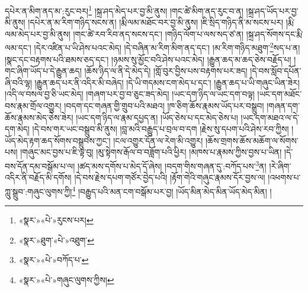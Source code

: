 དཔེར་ན་མིག་ནད་མ་:རུང་བར།\footnote{«སྣར་»«པེ་»རུངས་པར།} །སྐྲ་ཤད་མེད་པར་བྱ་མི་ནུས། །གང་ཚེ་མིག་ནད་རུང་བ་ན། །སྐྲ་ཤད་ཡོད་པར་བྱ་མི་ནུས། །དཔེར་ན་མ་རིག་གཉིད་སངས་ན། །རྨི་ལམ་མཐོང་བར་བྱ་མི་ནུས། །ཇི་སྲིད་གཉིད་ནི་མ་སངས་པར། །རྨི་ལམ་མེད་པར་བྱ་མི་ནུས། །གང་ཚེ་རབ་རིབ་ནད་སངས་དང་། །གཉིད་ལོག་པ་ལས་སད་ཙ་ན། །སྐྲ་ཤད་སོགས་དང་རྨི་ལམ་དང་། །དེར་འཛིན་པ་ཡི་ཤེས་པའང་མེད། །དེ་བཞིན་མ་རིག་མིག་ནད་དང་། །མ་རིག་གཉིད་མཐུག་\footnote{«སྣར་»ཐུག་«པེ་»འཐུག་}སད་པ་ན། །སྣང་དང་བརྟགས་པའི་ཐམས་ཅད་དང་། །ཉམས་སུ་མྱོང་བའི་ཤེས་པའང་མེད། །རྒྱུན་ཆད་མ་ཆད་ཅེས་བརྗོད་པ། །གང་ཞིག་ཡོད་པ་དེ་རྒྱུན་ཆད། །ཆོས་ཉིད་ལ་ནི་དེ་མེད་དེ། །གློ་བུར་བྱིས་པས་བརྟགས་པར་ཟད། །དེ་བས་སློབ་དཔོན་ཞི་བའི་ལྷ། །རྒྱུན་ཆད་པར་ནི་འདིར་མི་བཞེད། །དེ་ཡི་གདམས་ངག་མེད་པ་དང་། །རྒྱུན་ཆད་པ་ཡི་གཞུང་ཡིན་ཟེར། །འདི་ལ་བསལ་བྱ་ཅི་ཡང་མེད། །གཞག་པར་བྱ་བ་ཅུང་ཟད་མེད། །ཡང་དག་ཉིད་ལ་ཡང་དག་བལྟ། །ཡང་དག་མཐོང་བས་རྣམ་གྲོལ་འགྱུར། །བདག་དང་གཞན་གྱི་གྲུབ་པའི་མཐའ། །ཁ་ཅིག་ཆོས་རྣམས་ཡོད་པར་བསྒྲུབ། །གཞན་དག་ཆོས་རྣམས་མེད་ཅེས་ཟེར། །ཡང་དག་ཉིད་ལ་རྣམ་དཔྱད་ན། །ཡོད་ཅེས་པ་དང་མེད་ཅེས་པ། །ཡང་དག་མཐའ་ལ་དེ་དག་མེད། །དེ་བས་གར་ཡང་བསྒྲུབ་མི་ནུས། །བླ་མའི་བརྒྱུད་པ་བྲལ་བ་དག །རྗེས་སུ་དཔག་པའི་ཤེས་རབ་ཀྱིས། །ཡོད་མེད་རྟག་ཆད་སོགས་བསྒྲུབས་ཀྱང་། །ངལ་འགྱུར་དོན་ལ་རེག་མི་འགྱུར། །ཆོས་གྲགས་ཆོས་མཆོག་ལ་སོགས་པས། །གཞུང་མང་བྱས་པ་ཇི་ལྟ་བུ། །མུ་སྟེགས་རྒོལ་བ་བཟློག་པའི་ཕྱིར། །མཁས་པ་རྣམས་ཀྱིས་བྱས་པ་ཡིན། །དེ་བས་དོན་དམ་བསྒོམ་པ་ལ། །ཚད་མས་དགོས་པ་མེད་དོ་ཞེས། །བདག་གིས་གཞན་དུ་:བཀོད་པས་\footnote{«སྣར་»«པེ་»བཀོད་པ་}ན། །རེ་ཞིག་འདིར་ནི་བརྗོད་མི་དགོས། །དེ་བས་རྗེས་དཔག་གཙོར་བྱེད་པའི། །རྟོག་གེའི་གཞུང་རྣམས་དོར་བྱས་ལ། །འཕགས་པ་ཀླུ་སྒྲུབ་:གཞུང་ལུགས་ཀྱི།\footnote{«སྣར་»«པེ་»གཞུང་ལུགས་ཀྱིས།} །བརྒྱུད་པའི་མན་ངག་བསྒོམ་པར་བྱ། །ཡོད་མིན་མེད་མིན་ཡོད་མེད་མིན། །
